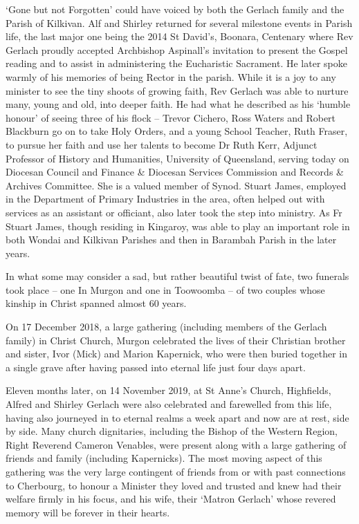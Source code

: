 `Gone but not Forgotten' could have voiced by both the Gerlach family and the Parish of Kilkivan. Alf and Shirley returned for several milestone events in Parish life, the last major one being the 2014 St David's, Boonara, Centenary where Rev Gerlach proudly accepted Archbishop Aspinall's invitation to present the Gospel reading and to assist in administering the Eucharistic Sacrament. He later spoke warmly of his memories of being Rector in the parish. While it is a joy to any minister to see the tiny shoots of growing faith, Rev Gerlach was able to nurture many, young and old, into deeper faith. He had what he described as his `humble honour' of seeing three of his flock -- Trevor Cichero, Ross Waters and Robert Blackburn go on to take Holy Orders, and a young School Teacher, Ruth Fraser, to pursue her faith and use her talents to become Dr Ruth Kerr, Adjunct Professor of History and Humanities, University of Queensland, serving today on Diocesan Council and Finance \& Diocesan Services Commission and Records \& Archives Committee. She is a valued member of Synod. Stuart James, employed in the Department of Primary Industries in the area, often helped out with services as an assistant or officiant, also later took the step into ministry. As Fr Stuart James, though residing in Kingaroy, was able to play an important role in both Wondai and Kilkivan Parishes and then in Barambah Parish in the later years.



In what some may consider a sad, but rather beautiful twist of fate, two funerals took place -- one In Murgon and one in Toowoomba -- of two couples whose kinship in Christ spanned almost 60 years.



On 17 December 2018, a large gathering (including members of the Gerlach family) in Christ Church, Murgon celebrated the lives of their Christian brother and sister, Ivor (Mick) and Marion Kapernick, who were then buried together in a single grave after having passed into eternal life just four days apart.



Eleven months later, on 14 November 2019, at St Anne's Church, Highfields, Alfred and Shirley Gerlach were also celebrated and farewelled from this life, having also journeyed in to eternal realms a week apart and now are at rest, side by side. Many church dignitaries, including the Bishop of the Western Region, Right Reverend Cameron Venables, were present along with a large gathering of friends and family (including Kapernicks). The most moving aspect of this gathering was the very large contingent of friends from or with past connections to Cherbourg, to honour a Minister they loved and trusted and knew had their welfare firmly in his focus, and his wife, their `Matron Gerlach' whose revered memory will be forever in their hearts.



